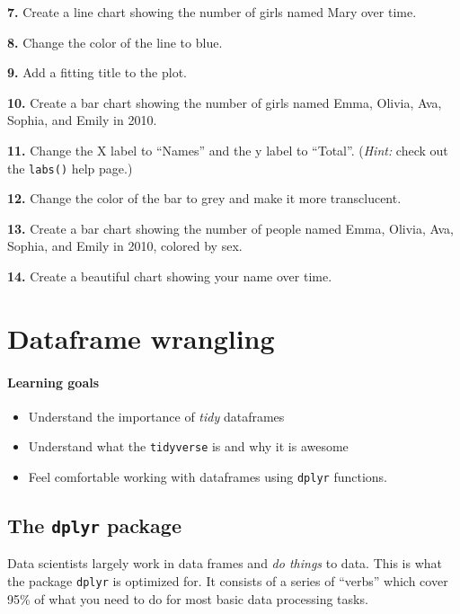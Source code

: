\documentclass[
]{book}
\providecommand{\tightlist}{%
  \setlength{\itemsep}{0pt}\setlength{\parskip}{0pt}}
\begin{document}
\textbf{7.} Create a line chart showing the number of girls named Mary over time.

\textbf{8.} Change the color of the line to blue.

\textbf{9.} Add a fitting title to the plot.

\textbf{10.} Create a bar chart showing the number of girls named Emma, Olivia, Ava, Sophia, and Emily in 2010.

\textbf{11.} Change the X label to ``Names'' and the y label to ``Total''. (\emph{Hint:} check out the \texttt{labs()} help page.)

\textbf{12.} Change the color of the bar to grey and make it more transclucent.

\textbf{13.} Create a bar chart showing the number of people named Emma, Olivia, Ava, Sophia, and Emily in 2010, colored by sex.

\textbf{14.} Create a beautiful chart showing your name over time.

\hypertarget{dplyr}{%
\chapter{Dataframe wrangling}\label{dplyr}}

\hypertarget{learning-goals-9}{%
\subsubsection*{Learning goals}\label{learning-goals-9}}

\begin{itemize}
\tightlist
\item
  Understand the importance of \emph{tidy} dataframes
\item
  Understand what the \texttt{tidyverse} is and why it is awesome
\item
  Feel comfortable working with dataframes using \texttt{dplyr} functions.
\end{itemize}

\hypertarget{the-dplyr-package}{%
\section*{\texorpdfstring{The \texttt{dplyr} package}{The dplyr package}}\label{the-dplyr-package}}

Data scientists largely work in data frames and \emph{do things} to data. This is what the package \texttt{dplyr} is optimized for. It consists of a series of ``verbs'' which cover 95\% of what you need to do for most basic data processing tasks.
\end{document}
